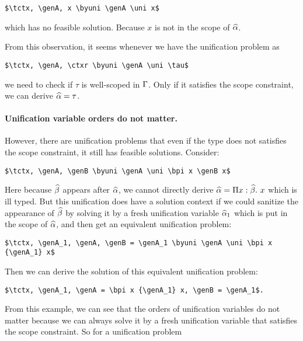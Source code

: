 \begin{lstlisting}
$\tctx, \genA, x \byuni \genA \uni x$
\end{lstlisting}

\noindent which has no feasible solution. Because $x$ is not in the scope of $\widehat{\alpha}$.

From this observation, it seems whenever we have the unification problem as

\begin{lstlisting}
$\tctx, \genA, \ctxr \byuni \genA \uni \tau$
\end{lstlisting}

\noindent we need to check if $\tau$ is well-scoped in $\Gamma$. Only if it
satisfies the scope constraint, we can derive $\widehat{\alpha} = \tau$.

\paragraph{Unification variable orders do not matter.}

However, there are unification problems that even if the type does not satisfies the
scope constraint, it still has feasible solutions. Consider:

\begin{lstlisting}
$\tctx, \genA, \genB \byuni \genA \uni \bpi x \genB x$
\end{lstlisting}

Here because $\widehat{\beta}$ appears after $\widehat{\alpha}$, we cannot directly derive $\widehat{\alpha} =
\Pi x:\widehat{\beta}.~ x$ which is ill typed.
But this unification does have a solution context if we could sanitize the
appearance of $\widehat{\beta}$ by solving it by a fresh unification variable $\widehat{\alpha}_1$
which is put in the scope of $\widehat{\alpha}$, and then
get an equivalent unification problem:

\begin{lstlisting}
$\tctx, \genA_1, \genA, \genB = \genA_1 \byuni \genA \uni \bpi x {\genA_1} x$
\end{lstlisting}

\noindent Then we can derive the solution of this equivalent unification problem:

\begin{lstlisting}
$\tctx, \genA_1, \genA = \bpi x {\genA_1} x, \genB = \genA_1$.
\end{lstlisting}

From this example, we can see that the orders of unification variables do not
matter because we can always solve it by a fresh unification variable that
satisfies the scope constraint. So for a unification problem

